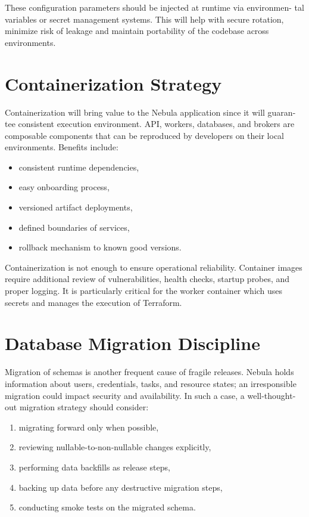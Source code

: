 These configuration parameters should be injected at runtime via environmen- tal variables or secret management systems. This will help with secure rotation, minimize risk of leakage and maintain portability of the codebase across environments.

\section{Containerization Strategy}
Containerization will bring value to the Nebula application since it will guaran- tee consistent execution environment. API, workers, databases, and brokers are composable components that can be reproduced by developers on their local environments. Benefits include:

\begin{itemize}
    \item consistent runtime dependencies,
    \item easy onboarding process,
    \item versioned artifact deployments,
    \item defined boundaries of services,
    \item rollback mechanism to known good versions.
\end{itemize}


Containerization is not enough to ensure operational reliability. Container images require additional review of vulnerabilities, health checks, startup probes, and proper logging. It is particularly critical for the worker container which uses secrets and manages the execution of Terraform.

\section{Database Migration Discipline}
Migration of schemas is another frequent cause of fragile releases. Nebula holds information about users, credentials, tasks, and resource states; an irresponsible migration could impact security and availability. In such a case, a well-thought-out migration strategy should consider:

\begin{enumerate}
    \item migrating forward only when possible,
    \item reviewing nullable-to-non-nullable changes explicitly,
    \item performing data backfills as release steps,
    \item backing up data before any destructive migration steps,
    \item conducting smoke tests on the migrated schema.
\end{enumerate}

